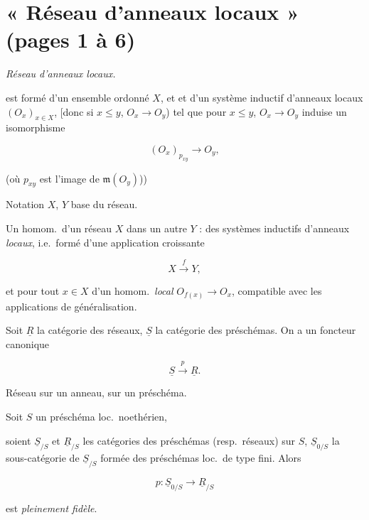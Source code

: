 \documentclass[11pt,a4paper]{article}
\begin{document}
\section*{« Réseau d'anneaux locaux » (pages 1 à 6)}

\emph{Réseau d'anneaux locaux.}

\ill{} est formé d'un ensemble ordonné $X$, et 
et d'un système inductif d'anneaux locaux $(O_x)_{x \in X}$, [donc si
$x \leq y$, \ill{} $O_x \to O_y$) tel que pour $x \leq y$, $O_x \to O_y$
induise un isomorphisme

\[ (O_x)_{p_{xy}} \longrightarrow O_y, \]

(où $p_{xy}$ est l'image \ill{} de $\mathfrak{m}(O_y)$))


Notation $X$, $Y$ \ill{} base du réseau.

Un homom.\ d'un réseau $X$ dans un autre $Y$ : \ill{} des systèmes inductifs
d'anneaux \emph{locaux}, i.e.\ formé d'une application \struck{\ill{}}
croissante

\[ X \xrightarrow{\ f\ } Y, \]

et pour tout $x \in X$ d'un homom.\ \emph{local} $O_{f(x)} \to O_x$,
compatible avec les applications de  généralisation.

Soit $\underline{R}$ la catégorie des réseaux, $\underline{S}$ la catégorie
des préschémas. On a un foncteur canonique

\[ \underline{S} \xrightarrow{\ p\ } \underline{R}. \]

Réseau sur un anneau, sur un préschéma.

Soit $S$ un préschéma loc.\ noethérien,

soient $\underline{S}_{/S}$ et $\underline{R}_{/S}$ les catégories des
préschémas (resp.\ réseaux) sur $S$, $\underline{S}_{0/S}$ la sous-catégorie
de $\underline{S}_{/S}$ formée des préschémas loc.\ de type fini. Alors

\[ p : \underline{S}_{0/S} \longrightarrow \underline{R}_{/S} \]

est \emph{pleinement fidèle}.

\end{document}
